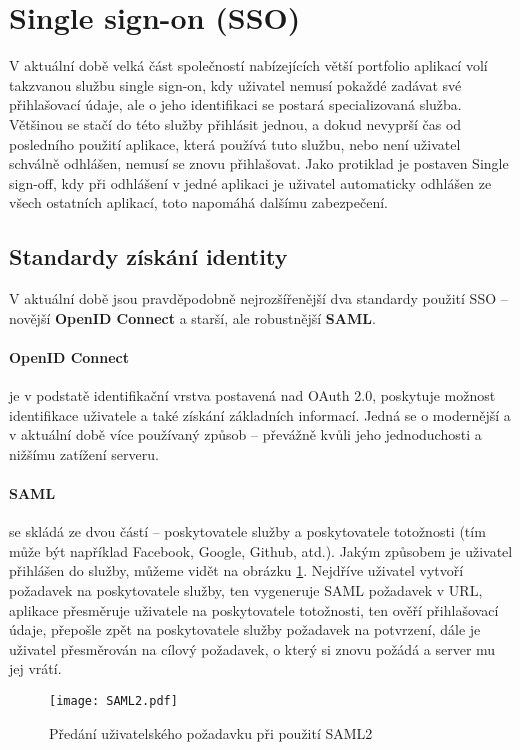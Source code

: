 \section{Single sign-on (SSO)}
\par V aktuální době velká část společností nabízejících větší portfolio aplikací volí takzvanou službu single sign-on, kdy uživatel nemusí pokaždé zadávat své přihlašovací údaje, ale o jeho identifikaci se postará specializovaná služba. Většinou se stačí do této služby přihlásit jednou, a dokud nevyprší čas od posledního použití aplikace, která používá tuto službu, nebo není uživatel schválně odhlášen, nemusí se znovu přihlašovat. Jako protiklad je postaven Single sign-off, kdy při odhlášení v jedné aplikaci je uživatel automaticky odhlášen ze všech ostatních aplikací, toto napomáhá dalšímu zabezpečení.

\subsection{Standardy získání identity}
\par V aktuální době jsou pravděpodobně nejrozšířenější dva standardy použití SSO -- novější \textbf{OpenID Connect} a starší, ale robustnější \textbf{SAML}.

\paragraph{OpenID Connect} je v podstatě identifikační vrstva postavená nad OAuth 2.0, poskytuje možnost identifikace uživatele a také získání základních informací. Jedná se o modernější a v aktuální době více používaný způsob -- převážně kvůli jeho jednoduchosti a nižšímu zatížení serveru. \cite{oidc}

\paragraph{SAML} se skládá ze dvou částí -- poskytovatele služby a poskytovatele totožnosti (tím může být například Facebook, Google, Github, atd.). Jakým způsobem je uživatel přihlášen do služby, můžeme vidět na obrázku \ref{saml2}. Nejdříve uživatel vytvoří požadavek na poskytovatele služby, ten vygeneruje SAML požadavek v URL, aplikace přesměruje uživatele na poskytovatele totožnosti, ten ověří přihlašovací údaje, přepošle zpět na poskytovatele služby požadavek na potvrzení, dále je uživatel přesměrován na cílový požadavek, o který si znovu požádá a server mu jej vrátí. \cite{saml}
\begin{figure}[!htp]
\centering
\texttt{[image: SAML2.pdf]}
\caption{Předání uživatelského požadavku při použití SAML2}
\label{saml2}
\end{figure}

